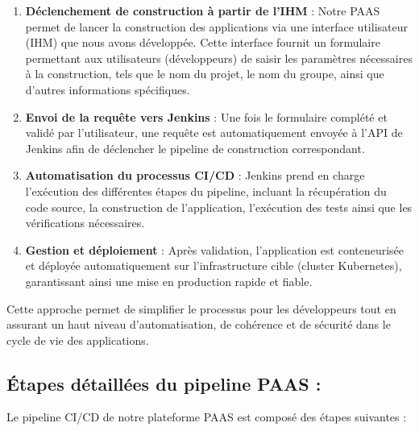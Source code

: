\begin{enumerate}
    \item \textbf{Déclenchement de construction à partir de l’IHM} :  
    Notre PAAS permet de lancer la construction des applications via une interface utilisateur (IHM) que nous avons développée. Cette interface fournit un formulaire permettant aux utilisateurs (développeurs) de saisir les paramètres nécessaires à la construction, tels que le nom du projet, le nom du groupe, ainsi que d’autres informations spécifiques.

    \item \textbf{Envoi de la requête vers Jenkins} :  
    Une fois le formulaire complété et validé par l’utilisateur, une requête est automatiquement envoyée à l’API de Jenkins afin de déclencher le pipeline de construction correspondant.

    \item \textbf{Automatisation du processus CI/CD} :  
    Jenkins prend en charge l’exécution des différentes étapes du pipeline, incluant la récupération du code source, la construction de l’application, l’exécution des tests ainsi que les vérifications nécessaires.

    \item \textbf{Gestion et déploiement} :  
    Après validation, l’application est conteneurisée et déployée automatiquement sur l’infrastructure cible (cluster Kubernetes), garantissant ainsi une mise en production rapide et fiable.

\end{enumerate}

Cette approche permet de simplifier le processus pour les développeurs tout en assurant un haut niveau d’automatisation, de cohérence et de sécurité dans le cycle de vie des applications.
\subsection{Étapes détaillées du pipeline PAAS :}

Le pipeline CI/CD de notre plateforme PAAS est composé des étapes suivantes :

